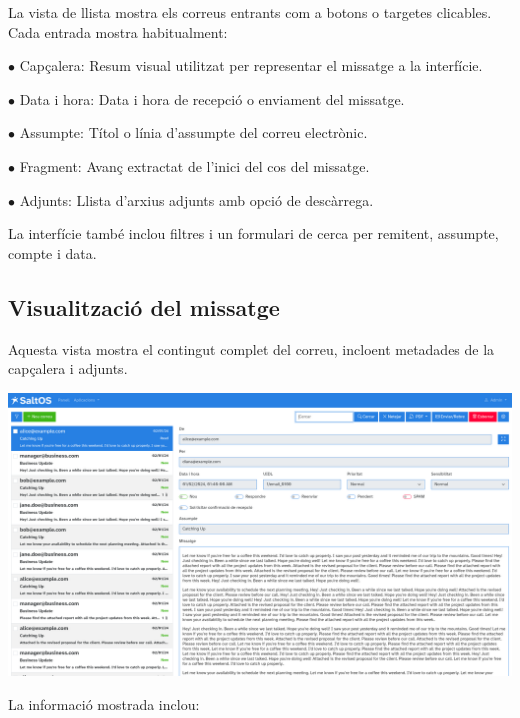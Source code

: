 \documentclass[a4paper]{article}
\begin{document}
La vista de llista mostra els correus entrants com a botons o targetes clicables.
Cada entrada mostra habitualment:

\begin{compactitem}
\item[\color{myblue}$\bullet$] Capçalera: Resum visual utilitzat per representar el missatge a la interfície.
\item[\color{myblue}$\bullet$] Data i hora: Data i hora de recepció o enviament del missatge.
\item[\color{myblue}$\bullet$] Assumpte: Títol o línia d'assumpte del correu electrònic.
\item[\color{myblue}$\bullet$] Fragment: Avanç extractat de l'inici del cos del missatge.
\item[\color{myblue}$\bullet$] Adjunts: Llista d'arxius adjunts amb opció de descàrrega.
\end{compactitem}

La interfície també inclou filtres i un formulari de cerca per remitent, assumpte, compte i data.

\hypertarget{toc93}{}
\subsection{Visualització del missatge}

Aquesta vista mostra el contingut complet del correu, incloent metadades de la capçalera i adjunts.

\begin{center}\includegraphics[width=1\textwidth]{../ujest/snaps/test-screenshots-js-screenshots-emails-emails-view-100-ca-es-1-snap.png}\end{center}

La informació mostrada inclou:
\end{document}
